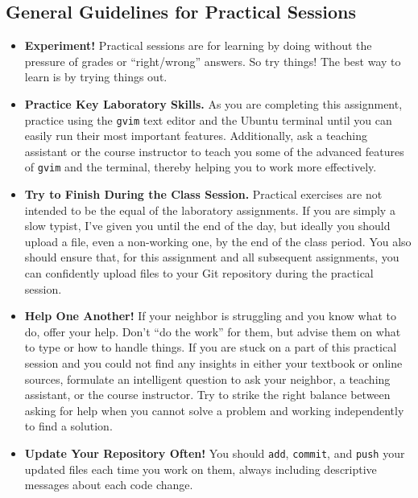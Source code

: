 \subsection*{General Guidelines for Practical Sessions}
\vspace*{-.05in}
\begin{itemize}

\item {\bf Experiment!} Practical sessions are for learning by doing without the pressure of grades or ``right/wrong''
  answers. So try things!  The best way to learn is by trying things out.

\item {\bf Practice Key Laboratory Skills.} As you are completing this assignment, practice using the {\tt gvim} text
  editor and the Ubuntu terminal until you can easily run their most important features.  Additionally, ask
  a teaching assistant or the course instructor to teach you some of the advanced features of {\tt gvim} and the
  terminal, thereby helping you to work more effectively.

\item {\bf Try to Finish During the Class Session.} Practical exercises are not intended to be the equal of the
  laboratory assignments. If you are simply a slow typist, I've given you until the end of the day, but ideally you
  should upload a file, even a non-working one, by the end of the class period. You also should ensure that, for this
  assignment and all subsequent assignments, you can confidently upload files to your Git repository during the
  practical session.

\item {\bf Help One Another!} If your neighbor is struggling and you know what to do, offer your help. Don't ``do the
  work'' for them, but advise them on what to type or how to handle things. If you are stuck on a part of this practical
  session and you could not find any insights in either your textbook or online sources, formulate an intelligent
  question to ask your neighbor, a teaching assistant, or the course instructor. Try to strike the right balance between
  asking for help when you cannot solve a problem and working independently to find a solution.

\item {\bf Update Your Repository Often!} You should {\tt add}, {\tt commit}, and {\tt push} your updated files each
  time you work on them, always including descriptive messages about each code change.


\end{itemize}
